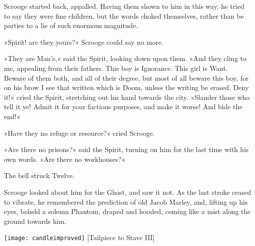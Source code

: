 Scrooge started back, appalled. Having them shown to him in this way, he tried to say they were fine children, but the words choked themselves, rather than be parties to a lie of such enormous magnitude.

»Spirit! are they yours?« Scrooge could say no more.

»They are Man's,« said the Spirit, looking down upon them. »And they cling to me, appealing from their fathers. This boy is Ignorance. This girl is Want. Beware of them both, and all of their degree, but most of all beware this boy, for on his brow I see that written which is Doom, unless the writing be erased. Deny it!« cried the Spirit, stretching out his hand towards the city. »Slander those who tell it ye! Admit it for your factious purposes, and make it worse! And bide the end!«

»Have they no refuge or resource?« cried Scrooge.

»Are there no prisons?« said the Spirit, turning on him for the last time with his own words. »Are there no workhouses?«

The bell struck Twelve.

Scrooge looked about him for the Ghost, and saw it not. As the last stroke ceased to vibrate, he remembered the prediction of old Jacob Marley, and, lifting up his eyes, beheld a solemn Phantom, draped and hooded, coming like a mist along the ground towards him.

	\begin{center}
		\texttt{[image: candleimproved]}
		[Tailpiece to Stave III]{}
	\end{center}
